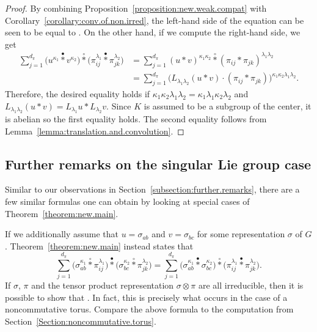 \documentclass[pdftex]{sigma}
\numberwithin{equation}{section}
\theoremstyle{definition}
\newcommand{\stardot}{\overset{{\bullet}}{*}}
\newcommand{\starcirc}{\overset{\circ}{*}}
\begin{document}
\begin{proof}
By combining Proposition~\ref{proposition:new.weak.compat} with Corollary~\ref{corollary:conv.of.non.irred}, the left-hand side of the equation can be seen to be equal to
.
 On the other hand, if we compute the right-hand side, we get
 \begin{align*}
     \sum_{j = 1}^{d_\pi} \big( u^{\kappa_1} \stardot  v^{\kappa_2} \big) \starcirc \big(\pi_{ij}^{\lambda_1} \stardot \pi_{jk}^{\lambda_2} \big)
     &=   \sum_{j = 1}^{d_\pi} (u * v)^{\kappa_1 \kappa_2} \starcirc (\pi_{ij} *\pi_{jk})^{\lambda_1 \lambda_2} \\
     &= \sum_{j=1}^{d_\pi} \big( L_{\lambda_1 \lambda_2} (u * v) \cdot (\pi_{ij} * \pi_{jk} ) \big)^{\kappa_1 \kappa_2 \lambda_1 \lambda_2 }.
 \end{align*}
 Therefore, the desired equality holds if
$\kappa_1 \kappa_2 \lambda_1 \lambda_2 = \kappa_1 \lambda_1 \kappa_2 \lambda_2$
 and
$ L_{\lambda_1 \lambda_2} (u * v) = L_{\lambda_1} u * L_{\lambda_2} v$.
Since $ K $ is assumed to be a subgroup of the center, it is abelian so the first equality holds. The second equality follows from Lemma~\ref{lemma:translation.and.convolution}.
\end{proof}

\subsection{Further remarks on the singular Lie group case}
Similar to our observations in Section~\ref{subsection:further.remarks}, there are a few similar formulas one can obtain by looking at special cases of Theorem~\ref{theorem:new.main}.

If we additionally assume that $ u = \sigma_{ab} $ and $ v = \sigma_{bc} $ for some representation $ \sigma $ of $ G $. Theorem~\ref{theorem:new.main} instead states that
  \[
   \sum_{j = 1}^{d_\pi} \big( \sigma_{ab}^{\kappa_1} \starcirc \pi_{ij}^{\lambda_1} \big) \stardot \big( \sigma_{bc}^{\kappa_2} \starcirc \pi_{jk}^{\lambda_2} \big) =   \sum_{j = 1}^{d_\pi} \big( \sigma_{ab}^{\kappa_1} \stardot  \sigma_{bc}^{\kappa_2} \big) \starcirc \big(\pi_{ij}^{\lambda_1} \stardot \pi_{jk}^{\lambda_2} \big).
  \]
  If $ \sigma $, $ \pi $ and the tensor product representation $ \sigma \otimes \pi $ are all irreducible, then it is possible to show that
    \smash{$
    \big( \sigma_{ab}^{\kappa_1} \starcirc \pi_{ij}^{\lambda_1} \big) \stardot \big( \sigma_{bc}^{\kappa_2} \starcirc \pi_{jk}^{\lambda_2} \big) =  \big( \sigma_{ab}^{\kappa_1} \stardot  \sigma_{bc}^{\kappa_2} \big) \starcirc \big(\pi_{ij}^{\lambda_1} \stardot \pi_{jk}^{\lambda_2} \big)$}.
  In fact, this is precisely what occurs in the case of a noncommutative torus. Compare the above formula to the computation from Section~\ref{Section:noncommutative.torus}.
\end{document}
